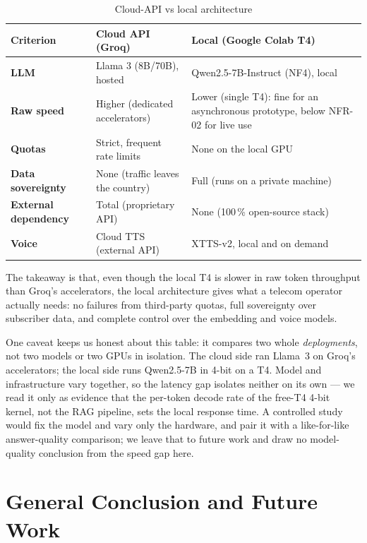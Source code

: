 \documentclass[12pt, a4paper]{report}
\newcommand{\humantext}[1]{#1}      %
\begin{document}
\begin{table}[H]
\centering
\caption{Cloud-API vs local architecture}
\label{tab:api_vs_local}
\begin{tabularx}{\textwidth}{l X X}
\toprule
\textbf{Criterion} & \textbf{Cloud API (Groq)} & \textbf{Local (Google Colab T4)} \\
\midrule
\textbf{LLM}            & Llama 3 (8B/70B), hosted & Qwen2.5-7B-Instruct (NF4), local \\
\textbf{Raw speed}      & Higher (dedicated accelerators) & Lower (single T4): fine for an asynchronous prototype, below NFR-02 for live use \\
\textbf{Quotas}         & Strict, frequent rate limits & None on the local GPU \\
\textbf{Data sovereignty} & None (traffic leaves the country) & Full (runs on a private machine) \\
\textbf{External dependency} & Total (proprietary API) & None (100\,\% open-source stack) \\
\textbf{Voice}          & Cloud TTS (external API) & XTTS-v2, local and on demand \\
\bottomrule
\end{tabularx}
\end{table}

\humantext{The takeaway is that, even though the local T4 is slower in raw token throughput than Groq's accelerators, the local architecture gives what a telecom operator actually needs: no failures from third-party quotas, full sovereignty over subscriber data, and complete control over the embedding and voice models.}

\humantext{One caveat keeps us honest about this table: it compares two whole \emph{deployments}, not two models or two GPUs in isolation. The cloud side ran Llama~3 on Groq's accelerators; the local side runs Qwen2.5-7B in 4-bit on a T4. Model and infrastructure vary together, so the latency gap isolates neither on its own --- we read it only as evidence that the per-token decode rate of the free-T4 4-bit kernel, not the RAG pipeline, sets the local response time. A controlled study would fix the model and vary only the hardware, and pair it with a like-for-like answer-quality comparison; we leave that to future work and draw no model-quality conclusion from the speed gap here.}

\chapter*{General Conclusion and Future Work}
\end{document}
